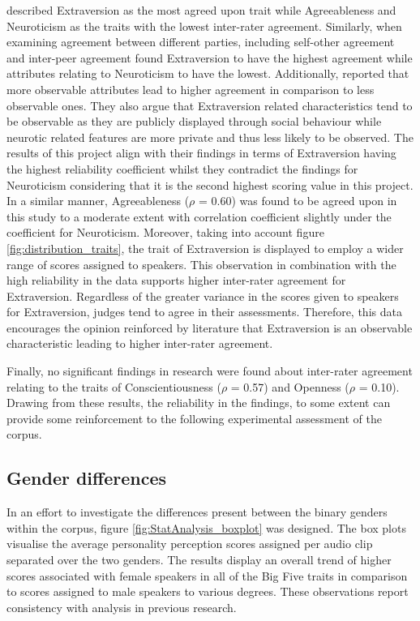 \documentclass{l4proj}
\begin{document}
\citet{norman1966raters} described Extraversion as the most agreed upon trait while Agreeableness and Neuroticism as the traits with the lowest inter-rater agreement. Similarly, when examining agreement between different parties, including self-other agreement and inter-peer agreement \citet{funder1987differences} found Extraversion to have the highest agreement while attributes relating to Neuroticism to have the lowest. Additionally, \citet{funder1988friends} reported that more observable attributes lead to higher agreement in comparison to less observable ones. They also argue that Extraversion related characteristics tend to be observable as they are publicly displayed through social behaviour while neurotic related features are more private and thus less likely to be observed.
The results of this project align with their findings in terms of Extraversion having the highest reliability coefficient whilst they contradict the findings for Neuroticism considering that it is the second highest scoring value in this project. In a similar manner, Agreeableness ($\rho$ = 0.60) was found to be agreed upon in this study to a moderate extent with correlation coefficient slightly under the coefficient for Neuroticism.
Moreover, taking into account figure \ref{fig:distribution_traits}, the trait of Extraversion is displayed to employ a wider range of scores assigned to speakers. This observation in combination with the high reliability in the data supports higher inter-rater agreement for Extraversion. Regardless of the greater variance in the scores given to speakers for Extraversion, judges tend to agree in their assessments. Therefore, this data encourages the opinion reinforced by literature that Extraversion is an observable characteristic leading to higher inter-rater agreement.

Finally, no significant findings in research were found about inter-rater agreement relating to the traits of Conscientiousness ($\rho$ = 0.57) and Openness ($\rho$ = 0.10).
Drawing from these results, the reliability in the findings, to some extent can provide some reinforcement to the following experimental assessment of the corpus.

\subsection{Gender differences}\label{sec:eval_genderDiff}
In an effort to investigate the differences present between the binary genders within the corpus, figure \ref{fig:StatAnalysis_boxplot} was designed. The box plots visualise the average personality perception scores assigned per audio clip separated over the two genders. The results display an overall trend of higher scores associated with female speakers in all of the Big Five traits in comparison to scores assigned to male speakers to various degrees. These observations report consistency with analysis in previous research.
\end{document}
